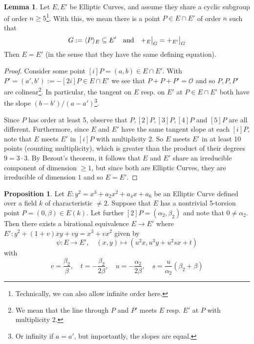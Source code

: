 \documentclass{scrartcl}
\renewcommand{\O}{\mathcal{O}}
\newcommand\restr[2]{{
    \left.\kern-\nulldelimiterspace
    #1
    \vphantom{\big|}
    \right|_{#2}
}}
\theoremstyle{definition}
\newtheorem{prop}[subsection]{Proposition}
\newtheorem{lemma}[subsection]{Lemma}
\begin{document}
\begin{lemma}
    \label{prop:share_subgroup_equal}
    Let $E, E'$ be Elliptic Curves, and assume they share a cyclic subgroup of order $n \geq 5$\footnote{Technically, we can also allow infinite order here.}.
    With this, we mean there is a point $P \in E \cap E'$ of order $n$ such that
    \begin{equation*}
        G := \langle P \rangle_E \subseteq E' \quad \text{and} \quad \restr{+_E}{G} = \restr{+_{E'}}{G}
    \end{equation*}
    Then $E = E'$ (in the sense that they have the same defining equation).
\end{lemma}
\begin{proof}
    Consider some point $[i] P = (a, b) \in E \cap E'$.
    With $P' = (a', b') := -[2i] P \in E \cap E'$ we see that $P + P + P' = \O$ and so $P, P, P'$ are colinear\footnote{We mean that the line through $P$ and $P'$ meets $E$ resp. $E'$ at $P$ with multiplicity 2.}.
    In particular, the tangent on $E$ resp. on $E'$ at $P \in E \cap E'$ both have the slope $(b - b')/(a - a')$\footnote{Or infinity if $a = a'$, but importantly, the slopes are equal.}.

    Since $P$ has order at least 5, observe that $P, [2]P, [3]P, [4]P$ and $[5]P$ are all different.
    Furthermore, since $E$ and $E'$ have the same tangent slope at each $[i] P$, note that $E$ meets $E'$ in $[i] P$ with multiplicity 2.
    So $E$ meets $E'$ in at least 10 points (counting multiplicity), which is greater than the product of their degrees $9 = 3 \cdot 3$.
    By Bezout's theorem, it follows that $E$ and $E'$ share an irreducible component of dimension $\geq 1$, but since both are Elliptic Curves, they are irreducible of dimension $1$ and so $E = E'$.
\end{proof}
\begin{prop}
    \label{prop:characterization_5_torsion}
    Let $E: y^2 = x^3 + a_2 x^2 + a_4 x + a_6$ be an Elliptic Curve defined over a field $k$ of characteristic $\neq 2$.
    Suppose that $E$ has a nontrivial 5-torsion point $P = (0, \beta) \in E(k)$.
    Let further $[2]P = (\alpha_2, \beta_2)$ and note that $0 \neq \alpha_2$.
    Then there exists a birational equivalence $E \to E'$ where $E': y^2 + (1 + v) x y + v y = x^3 + v x^2$ given by
    \begin{equation*}
        \psi: E \to E', \quad (x, y) \mapsto (u^2 x, u^3 y + u^2 s x + t)
    \end{equation*}
    with
    \begin{equation*}
        v = \frac {\beta_2} {\beta}, \quad t = -\frac {\beta_2} {2\beta}, \quad u = -\frac {\alpha_2} {2\beta}, \quad s = \frac {u} {\alpha_2} ( \beta_2 + \beta )
    \end{equation*}
\end{prop}
\end{document}
